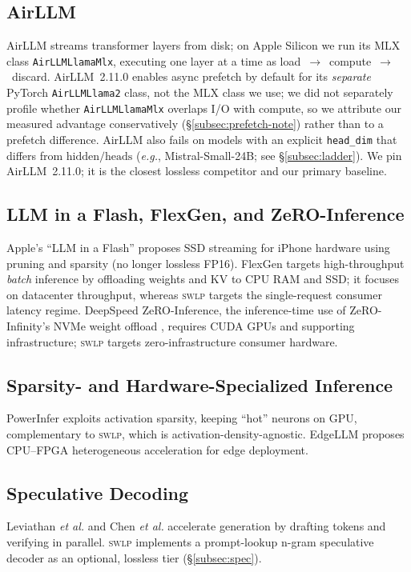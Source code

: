 \documentclass[10pt,a4paper]{article}
\newcommand{\swlp}{\textsc{swlp}}
\newcommand{\etal}{\textit{et al.}}
\newcommand{\eg}{\textit{e.g.}}
\begin{document}
\subsection{AirLLM}
AirLLM \cite{guo2023airllm} streams transformer layers from disk; on Apple Silicon
we run its MLX class \texttt{AirLLMLlamaMlx}, executing one layer at a time as
load~$\to$~compute~$\to$~discard. AirLLM~2.11.0 enables async prefetch by default
for its \emph{separate} PyTorch \texttt{AirLLMLlama2} class, not the MLX class we
use; we did not separately profile whether \texttt{AirLLMLlamaMlx} overlaps I/O
with compute, so we attribute our measured advantage conservatively
(\S\ref{subsec:prefetch-note}) rather than to a prefetch difference. AirLLM also fails on models with an explicit
\texttt{head\_dim} that differs from $\text{hidden}/\text{heads}$ (\eg,
Mistral-Small-24B; see \S\ref{subsec:ladder}). We pin AirLLM~2.11.0; it is the
closest lossless competitor and our primary baseline.

\subsection{LLM in a Flash, FlexGen, and ZeRO-Inference}
Apple's ``LLM in a Flash'' \cite{alizadeh2023llmflash} proposes SSD streaming for
iPhone hardware using pruning and sparsity (no longer lossless FP16). FlexGen
\cite{sheng2023flexgen} targets high-throughput \emph{batch} inference by
offloading weights and KV to CPU RAM and SSD; it focuses on datacenter
throughput, whereas \swlp{} targets the single-request consumer latency regime.
DeepSpeed ZeRO-Inference, the inference-time use of ZeRO-Infinity's NVMe weight
offload \cite{rajbhandari2021zero}, requires CUDA GPUs and supporting
infrastructure; \swlp{} targets zero-infrastructure consumer hardware.

\subsection{Sparsity- and Hardware-Specialized Inference}
PowerInfer \cite{song2023powerinfer} exploits activation sparsity, keeping
``hot'' neurons on GPU, complementary to \swlp{}, which is
activation-density-agnostic. EdgeLLM \cite{huang2025edgellm} proposes CPU--FPGA
heterogeneous acceleration for edge deployment.

\subsection{Speculative Decoding}
Leviathan \etal{} \cite{leviathan2023fast} and Chen \etal{}
\cite{chen2023speculative} accelerate generation by drafting tokens and verifying
in parallel. \swlp{} implements a prompt-lookup n-gram speculative decoder as an
optional, lossless tier (\S\ref{subsec:spec}).
\end{document}
